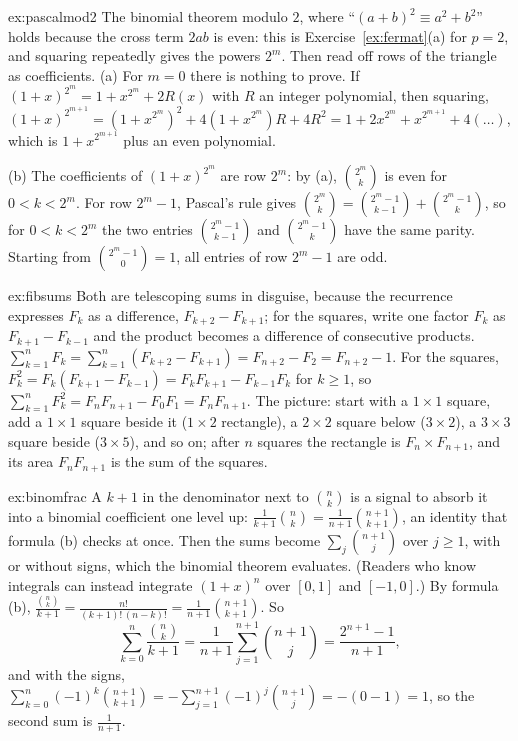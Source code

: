 \begin{solution}{ex:pascalmod2}
\idea The binomial theorem modulo $2$, where ``$(a+b)^2\equiv a^2+b^2$'' holds because the cross term $2ab$ is even: this is Exercise~\ref{ex:fermat}(a) for $p=2$, and squaring repeatedly gives the powers $2^m$. Then read off rows of the triangle as coefficients.
\writeup (a) For $m=0$ there is nothing to prove. If $(1+x)^{2^m}=1+x^{2^m}+2R(x)$ with $R$ an integer polynomial, then squaring,
$(1+x)^{2^{m+1}}=(1+x^{2^m})^2+4(1+x^{2^m})R+4R^2=1+2x^{2^m}+x^{2^{m+1}}+4(\dots)$, which is $1+x^{2^{m+1}}$ plus an even polynomial.

(b) The coefficients of $(1+x)^{2^m}$ are row $2^m$: by (a), $\binom{2^m}k$ is even for $0<k<2^m$. For row $2^m-1$, Pascal's rule gives $\binom{2^m}k=\binom{2^m-1}{k-1}+\binom{2^m-1}k$, so for $0<k<2^m$ the two entries $\binom{2^m-1}{k-1}$ and $\binom{2^m-1}k$ have the same parity. Starting from $\binom{2^m-1}0=1$, all entries of row $2^m-1$ are odd.
\end{solution}

\begin{solution}{ex:fibsums}
\idea Both are telescoping sums in disguise, because the recurrence expresses $F_k$ as a difference, $F_{k+2}-F_{k+1}$; for the squares, write one factor $F_k$ as $F_{k+1}-F_{k-1}$ and the product becomes a difference of consecutive products.
\writeup $\sum_{k=1}^nF_k=\sum_{k=1}^n(F_{k+2}-F_{k+1})=F_{n+2}-F_2=F_{n+2}-1$.
For the squares, $F_k^2=F_k(F_{k+1}-F_{k-1})=F_kF_{k+1}-F_{k-1}F_k$ for $k\ge1$, so $\sum_{k=1}^nF_k^2=F_nF_{n+1}-F_0F_1=F_nF_{n+1}$.
The picture: start with a $1\times1$ square, add a $1\times1$ square beside it ($1\times2$ rectangle), a $2\times2$ square below ($3\times2$), a $3\times3$ square beside ($3\times5$), and so on; after $n$ squares the rectangle is $F_n\times F_{n+1}$, and its area $F_nF_{n+1}$ is the sum of the squares.
\end{solution}

\begin{solution}{ex:binomfrac}
\idea A $k+1$ in the denominator next to $\binom nk$ is a signal to absorb it into a binomial coefficient one level up: $\frac1{k+1}\binom nk=\frac1{n+1}\binom{n+1}{k+1}$, an identity that formula (b) checks at once. Then the sums become $\sum_j\binom{n+1}j$ over $j\ge1$, with or without signs, which the binomial theorem evaluates. (Readers who know integrals can instead integrate $(1+x)^n$ over $[0,1]$ and $[-1,0]$.)
\writeup By formula (b), $\frac{\binom nk}{k+1}=\frac{n!}{(k+1)!\,(n-k)!}=\frac1{n+1}\binom{n+1}{k+1}$. So
\[
\sum_{k=0}^n\frac{\binom nk}{k+1}=\frac1{n+1}\sum_{j=1}^{n+1}\binom{n+1}j=\frac{2^{n+1}-1}{n+1},
\]
and with the signs, $\sum_{k=0}^n(-1)^k\binom{n+1}{k+1}=-\sum_{j=1}^{n+1}(-1)^j\binom{n+1}j=-(0-1)=1$, so the second sum is $\frac1{n+1}$.
\end{solution}

